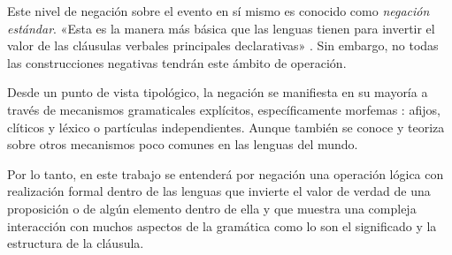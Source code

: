 Este nivel de negación sobre el evento en sí mismo es conocido como \textit{negación estándar}. «Esta es la manera más básica que las lenguas tienen para invertir el valor de las cláusulas verbales principales declarativas» \textcolor{MidnightBlue}{\citep{negStandar}}. Sin embargo, no todas las construcciones negativas tendrán este ámbito de operación.

Desde un punto de vista tipológico, la negación se manifiesta en su mayoría a través de mecanismos gramaticales explícitos, específicamente morfemas \textcolor{MidnightBlue}{\citep{morfemas}}: afijos, clíticos y léxico o partículas independientes. Aunque también se conoce y teoriza sobre otros mecanismos poco comunes en las lenguas del mundo.

Por lo tanto, en este trabajo se entenderá por negación una operación lógica con realización formal dentro de las lenguas que invierte el valor de verdad de una proposición o de algún elemento dentro de ella y que muestra una compleja interacción con muchos aspectos de la gramática como lo son el significado y la estructura de la cláusula.
